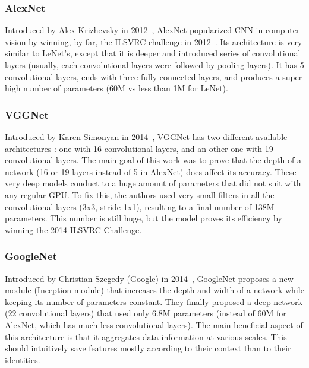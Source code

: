 \subsubsection{AlexNet} Introduced by Alex Krizhevsky in 2012~\cite{KRIZ12}, AlexNet popularized CNN in computer vision by winning, by far, the ILSVRC challenge in 2012~\cite{RUSS15}. Its architecture is very similar to LeNet's, except that it is deeper and introduced series of convolutional layers (usually, each convolutional layers were followed by pooling layers). It has 5 convolutional layers, ends with three fully connected layers, and produces a super high number of parameters (60M vs less than 1M for LeNet).

\subsubsection{VGGNet} Introduced by Karen Simonyan in 2014~\cite{SIMO14}, VGGNet has two different available architectures : one with 16 convolutional layers, and an other one with 19 convolutional layers. The main goal of this work was to prove that the depth of a network (16 or 19 layers instead of 5 in AlexNet) does affect its accuracy. These very deep models conduct to a huge amount of parameters that did not suit with any regular GPU. To fix this, the authors used very small filters in all the convolutional layers (3x3, stride 1x1), resulting to a final number of 138M parameters. This number is still huge, but the model proves its efficiency by winning the 2014 ILSVRC Challenge.

\subsubsection{GoogleNet} Introduced by Christian Szegedy (Google) in 2014~\cite{SZEG15}, GoogleNet proposes a new module (Inception module) that increases the depth and width of a network while keeping its number of parameters constant. They finally proposed a deep network (22 convolutional layers) that used only 6.8M parameters (instead of 60M for AlexNet, which has much less convolutional layers). The main beneficial aspect of this architecture is that it aggregates data information at various scales. This should intuitively save features mostly according to their context than to their identities.

